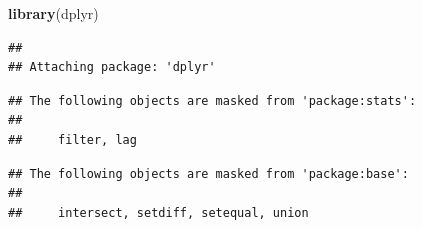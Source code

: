 \documentclass[
]{article}
\author{}
\date{\vspace{-2.5em}}
\newenvironment{Shaded}{\begin{snugshade}}{\end{snugshade}}
\newcommand{\FunctionTok}[1]{\textcolor[rgb]{0.13,0.29,0.53}{\textbf{#1}}}
\newcommand{\NormalTok}[1]{#1}
\begin{document}
\begin{Shaded}
\begin{Highlighting}[]
\FunctionTok{library}\NormalTok{(dplyr)}
\end{Highlighting}
\end{Shaded}

\begin{verbatim}
## 
## Attaching package: 'dplyr'
\end{verbatim}

\begin{verbatim}
## The following objects are masked from 'package:stats':
## 
##     filter, lag
\end{verbatim}

\begin{verbatim}
## The following objects are masked from 'package:base':
## 
##     intersect, setdiff, setequal, union
\end{verbatim}
\end{document}
